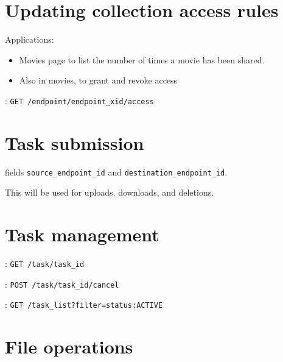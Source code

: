 
\section{Updating collection access rules}

Applications:
\begin{itemize}
  \item Movies page to list the number of times a movie has been shared.
  \item Also in movies, to grant and revoke access
\end{itemize}

\noindent {}: 
\texttt{GET /endpoint/endpoint\_xid/access}

\section{Task submission}

 fields \texttt{source\_endpoint\_id} 
and \texttt{destination\_endpoint\_id}.

This will be used for uploads, downloads, and deletions.

\section{Task management\label{section:taskmanagement}}

: \texttt{GET /task/task\_id}

: \texttt{POST /task/task\_id/cancel}

: \texttt{GET /task\_list?filter=status:ACTIVE}

\section{File operations}

